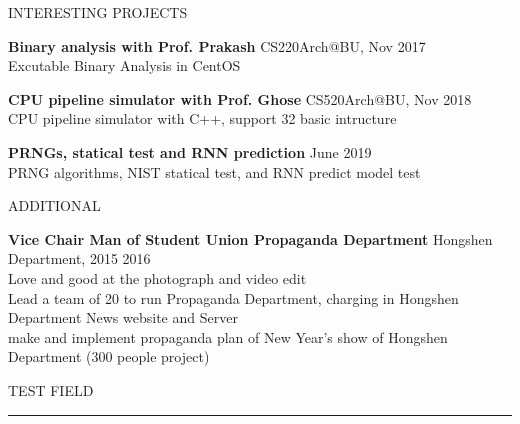 \documentclass{article}
\begin{document}
\vskip 0.1in
\noindent
INTERESTING PROJECTS
\hrulefill

\noindent
\textbf{Binary analysis with Prof. Prakash }
\href{https://github.com/RichardLee0211}{\FA \faExternalLink} %
\dotfill CS220Arch@BU, Nov 2017 \\
    \indent Excutable Binary Analysis in CentOS

\noindent
\textbf{CPU pipeline simulator with Prof. Ghose}
\href{https://github.com/RichardLee0211/CS520Arch_Ghose}{\FA \faExternalLink}
\dotfill CS520Arch@BU, Nov 2018 \\
    \indent CPU pipeline simulator with C++, support 32 basic intructure

\noindent
\textbf{PRNGs, statical test and RNN prediction}
\href{https://github.com/RichardLee0211}{\FA \faExternalLink} %
\dotfill June 2019 \\
    \indent PRNG algorithms, NIST statical test, and RNN predict model test

\vskip 0.1in
\noindent
ADDITIONAL
\hrulefill

\noindent
\textbf{Vice Chair Man of Student Union Propaganda Department}
\dotfill Hongshen Department, 2015  2016 \\
    \indent Love and good at the photograph and video edit \\
    \indent Lead a team of 20 to run Propaganda Department, charging in Hongshen Department News website and Server \\
    \indent make and implement propaganda plan of New Year's show of Hongshen Department (300 people project)

\vskip 0.1in
\noindent
TEST FIELD
\hrule


\end{document}
